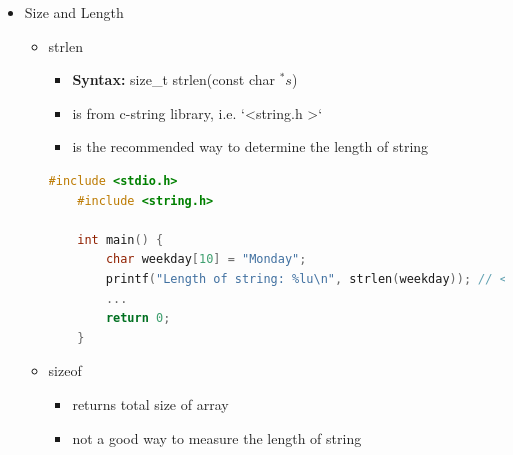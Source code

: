 \documentclass[12pt]{article}
\begin{document}
\begin{itemize}
    \item Size and Length
    \begin{itemize}
        \item strlen
        \begin{itemize}
            \item \textbf{Syntax:} size\_t strlen(const char $^*s$)
            \item is from c-string library, i.e. `\textless string.h \textgreater`
            \item is the recommended way to determine the length of string
        \end{itemize}

    \begin{lstlisting}[language=c,caption={strings\_example\_3.c}]
    #include <stdio.h>
    #include <string.h>

    int main() {
        char weekday[10] = "Monday";
        printf("Length of string: %lu\n", strlen(weekday)); // <- Returns 6
        ...
        return 0;
    }
    \end{lstlisting}

        \item sizeof
        \begin{itemize}
            \item returns total size of array
            \item not a good way to measure the length of string
        \end{itemize}
    \end{itemize}
\end{itemize}
\end{document}

